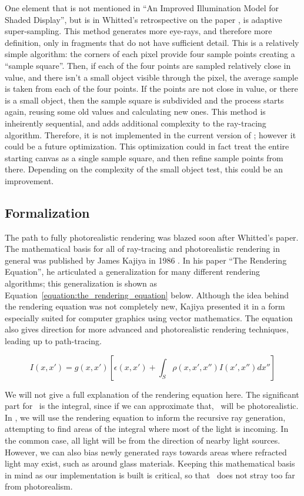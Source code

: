 One element that is not mentioned in ``An Improved Illumination Model for Shaded Display'', but is in Whitted's retrospective on the paper \cite{whitted2018explains}, is adaptive super-sampling.
This method generates more eye-rays, and therefore more definition, only in fragments that do not have sufficient detail.
This is a relatively simple algorithm: the corners of each pixel provide four sample points creating a ``sample square''.
Then, if each of the four points are sampled relatively close in value, and there isn't a small object visible through the pixel, the average sample is taken from each of the four points.
If the points are not close in value, or there is a small object, then the sample square is subdivided and the process starts again, reusing some old values and calculating new ones.
This method is inheirently sequential, and adds additional complexity to the ray-tracing algorithm.
Therefore, it is not implemented in the current version of \name; however it could be a future optimization.
This optimization could in fact treat the entire starting canvas as a single sample square, and then refine sample points from there.
Depending on the complexity of the small object test, this could be an improvement.

\subsection{Formalization}

The path to fully photorealistic rendering was blazed soon after Whitted's paper.
The mathematical basis for all of ray-tracing and photorealistic rendering in general was published by James Kajiya in 1986 \cite{kajiya1986rendering}.
In his paper ``The Rendering Equation'', he articulated a generalization for many different rendering algorithms; this generalization is shown as Equation~\ref{equation:the_rendering_equation} below.
Although the idea behind the rendering equation was not completely new, Kajiya presented it in a form especially suited for computer graphics using vector mathematics.
The equation also gives direction for more advanced and photorealistic rendering techniques, leading up to path-tracing.

\begin{equation}
  \label{equation:the_rendering_equation}
  I(x, x') = g(x, x') [\epsilon(x, x') + \int_{S} \rho(x, x',x'')I(x', x'')dx'']
\end{equation}

We will not give a full explanation of the rendering equation here.
The significant part for \name\ is the integral, since if we can approximate that, \name\ will be photorealistic.
In \name, we will use the rendering equation to inform the recursive ray generation, attempting to find areas of the integral where most of the light is incoming.
In the common case, all light will be from the direction of nearby light sources.
However, we can also bias newly generated rays towards areas where refracted light may exist, such as around glass materials.
Keeping this mathematical basis in mind as our implementation is built is critical, so that \name\ does not stray too far from photorealism.

